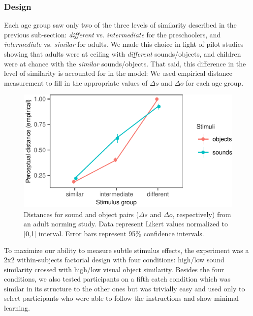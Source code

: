 \documentclass[english,,man]{apa6}
\begin{document}
\hypertarget{design}{%
\subsubsection{Design}\label{design}}

Each age group saw only two of the three levels of similarity described in the previous sub-section: \emph{different} vs. \emph{intermediate} for the preschoolers, and \emph{intermediate} vs. \emph{similar} for adults. We made this choice in light of pilot studies showing that adults were at ceiling with \emph{different} sounds/objects, and children were at chance with the \emph{similar} sounds/objects. That said, this difference in the level of similarity is accounted for in the model: We used empirical distance measurement to fill in the appropriate values of \(\Delta s\) and \(\Delta o\) for each age group.

\begin{figure}[h]

{\centering \includegraphics{ms_blind_files/figure-latex/stim-1} 

}

\caption{Distances for sound and object pairs ($\Delta s$ and $\Delta o$, respectively) from an adult norming study. Data represent Likert values normalized to [0,1] interval. Error bars represent 95\% confidence intervals.}\label{fig:stim}
\end{figure}

To maximize our ability to measure subtle stimulus effects, the experiment was a 2x2 within-subjects factorial design with four conditions: high/low sound similarity crossed with high/low visual object similarity. Besides the four conditions, we also tested participants on a fifth catch condition which was similar in its structure to the other ones but was trivially easy and used only to select participants who were able to follow the instructions and show minimal learning.
\end{document}
